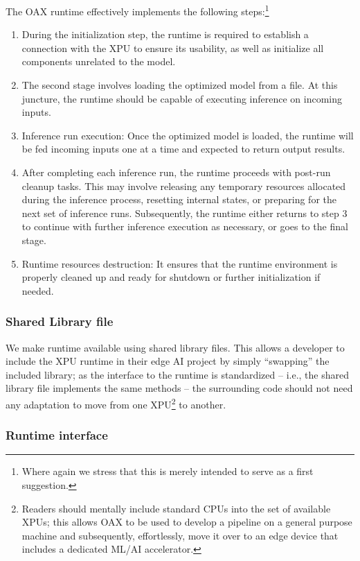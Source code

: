 \documentclass{article}
\begin{document}
The OAX runtime effectively implements the following steps:\footnote{Where again we stress that this is merely intended to serve as a first suggestion.}

\begin{enumerate}
\item During the initialization step, the runtime is required to establish a connection with the XPU to ensure its usability, as well as initialize all components unrelated to the model.
\item The second stage involves loading the optimized model from a file. At this juncture, the runtime should be capable of executing inference on incoming inputs.
\item Inference run execution: Once the optimized model is loaded, the runtime will be fed incoming inputs one at a time and expected to return output results.
\item After completing each inference run, the runtime proceeds with post-run cleanup tasks. This may involve releasing any temporary resources allocated during the inference process, resetting internal states, or preparing for the next set of inference runs. Subsequently, the runtime either returns to step 3 to continue with further inference execution as necessary, or goes to the final stage.
\item Runtime resources destruction: It ensures that the runtime environment is properly cleaned up and ready for shutdown or further initialization if needed.
\end{enumerate}

\subsubsection{Shared Library file}

We make runtime available using shared library files. This allows a developer to include the XPU runtime in their edge AI project by simply ``swapping'' the included library; as the interface to the runtime is standardized -- i.e., the shared library file implements the same methods -- the surrounding code should not need any adaptation to move from one XPU\footnote{Readers should mentally include standard CPUs into the set of available XPUs; this allows OAX to be used to develop a pipeline on a general purpose machine and subsequently, effortlessly, move it over to an edge device that includes a dedicated ML/AI accelerator.} to another.

\subsubsection{Runtime interface}
\end{document}

